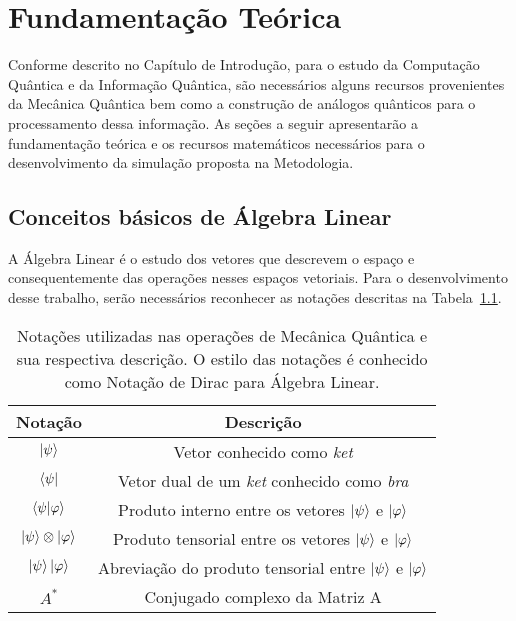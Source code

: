 
\chapter{Fundamentação Teórica}

Conforme descrito no Capítulo de Introdução, para o estudo da Computação Quântica e da Informação Quântica, são necessários alguns recursos provenientes da Mecânica Quântica bem como a construção de análogos quânticos para o processamento dessa informação. As seções a seguir apresentarão a fundamentação teórica e os recursos matemáticos necessários para o desenvolvimento da simulação proposta na Metodologia.

\section{Conceitos básicos de Álgebra Linear}
A Álgebra Linear é o estudo dos vetores que descrevem o espaço e consequentemente das operações nesses espaços vetoriais. Para o desenvolvimento desse trabalho, serão necessários reconhecer as notações descritas na Tabela~\ref{tab:notação}.

\begin{table}[ht!]
  \centering
  \caption{Notações utilizadas nas operações de Mecânica Quântica e sua respectiva descrição. O estilo das notações é conhecido como Notação de Dirac para Álgebra Linear.}\label{tab:notação}
  \begin{tabular}{cc}
    \toprule
    {\textbf{Notação}} & {\textbf{Descrição}}\\
    \midrule
    $\ket{\psi}$   & Vetor conhecido como \textit{ket} \\
    $\bra{\psi}$   & Vetor dual de um \textit{ket} conhecido como \textit{bra} \\
    $\braket{\psi|\varphi}$   & Produto interno entre os vetores $\ket{\psi}$ e $\ket{\varphi}$ \\
    $\ket{\psi} \otimes \ket{\varphi}$   & Produto tensorial entre os vetores $\ket{\psi}$ e $\ket{\varphi}$ \\
    $\ket{\psi}\ket{\varphi}$     & Abreviação do produto tensorial entre $\ket{\psi}$ e $\ket{\varphi}$ \\
    $A^*$     &  Conjugado complexo da Matriz A \\
    \bottomrule
  \end{tabular}
\end{table}

